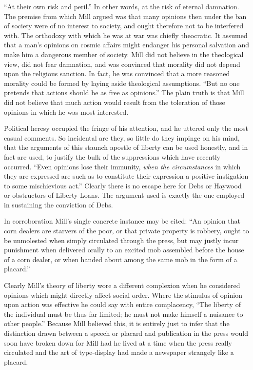\documentclass[openany,nobib,nohyper]{tufte-book}
\begin{document}
``At their own risk and peril.'' In other words, at the risk of eternal
damnation. The premise from which Mill argued was that many opinions
then under the ban of society were of no interest to society, and ought
therefore not to be interfered with. The orthodoxy with which he was at
war was chiefly theocratic. It assumed that a man's opinions on cosmic
affairs might endanger his personal salvation and make him a dangerous
member of society. Mill did not believe in the theological view, did not
fear damnation, and was convinced that morality did not depend upon the
religious sanction. In fact, he was convinced that a more reasoned
morality could be formed by laying aside theological assumptions. ``But
no one pretends that actions should be as free as opinions.'' The plain
truth is that Mill did not believe that much action would result from
the toleration of those opinions in which he was most interested.

Political heresy occupied the fringe of his attention, and he uttered
only the most casual comments. So incidental are they, so little do they
impinge on his mind, that the arguments of this staunch apostle of
liberty can be used honestly, and in fact are used, to justify the bulk
of the suppressions which have recently occurred. ``Even opinions lose
their immunity, \emph{when the circumstances} in which they are
expressed are such as to constitute their expression a positive
instigation to some mischievious act.'' Clearly there is no escape here
for Debs or Haywood or obstructors of Liberty Loans. The argument used
is exactly the one employed in sustaining the conviction of Debs.

In corroboration Mill's single concrete instance may be cited: ``An
opinion that corn dealers are starvers of the poor, or that private
property is robbery, ought to be unmolested when simply circulated
through the press, but may justly incur punishment when delivered orally
to an excited mob assembled before the house of a corn dealer, or when
handed about among the same mob in the form of a placard.''

Clearly Mill's theory of liberty wore a different complexion when he
considered opinions which might directly affect social order. Where the
stimulus of opinion upon action was effective he could say with entire
complacency, ``The liberty of the individual must be thus far limited;
he must not make himself a nuisance to other people.'' Because Mill
believed this, it is entirely just to infer that the distinction drawn
between a speech or placard and publication in the press would soon have
broken down for Mill had he lived at a time when the press really
circulated and the art of type-display had made a newspaper strangely
like a placard.
\end{document}
